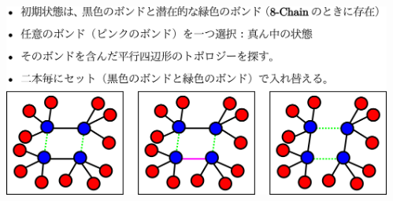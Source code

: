 \documentclass[12pt, dvipdfmx]{beamer}
\begin{document}
\begin{frame}
\begin{columns}[T, onlytextwidth]
\begin{center}
				\end{center}
				\includegraphics[width=\textwidth]{bond_exchg.png}
		\end{columns}
\end{frame}
\end{document}

